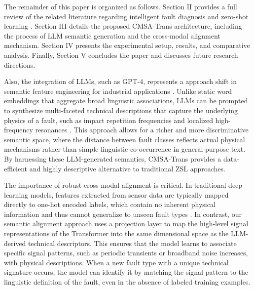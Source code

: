 \documentclass[journal]{IEEEtran}
\begin{document}
The remainder of this paper is organized as follows. Section II provides a full review of the related literature regarding intelligent fault diagnosis and zero-shot learning \cite{li2022zero}. Section III details the proposed CMSA-Trans architecture, including the process of LLM semantic generation and the cross-modal alignment mechanism. Section IV presents the experimental setup, results, and comparative analysis. Finally, Section V concludes the paper and discusses future research directions.

Also, the integration of LLMs, such as GPT-4, represents a approach shift in semantic feature engineering for industrial applications \cite{bubeck2023sparks}. Unlike static word embeddings that aggregate broad linguistic associations, LLMs can be prompted to synthesize multi-faceted technical descriptions that capture the underlying physics of a fault, such as impact repetition frequencies and localized high-frequency resonances \cite{brown2020language}. This approach allows for a richer and more discriminative semantic space, where the distance between fault classes reflects actual physical mechanisms rather than simple linguistic co-occurrence in general-purpose text. By harnessing these LLM-generated semantics, CMSA-Trans provides a data-efficient and highly descriptive alternative to traditional ZSL approaches.

The importance of robust cross-modal alignment is critical. In traditional deep learning models, features extracted from sensor data are typically mapped directly to one-hot encoded labels, which contain no inherent physical information and thus cannot generalize to unseen fault types \cite{goodfellow2016deep, lecun2015deep}. In contrast, our semantic alignment approach uses a projection layer to map the high-level signal representations of the Transformer into the same dimensional space as the LLM-derived technical descriptors. This ensures that the model learns to associate specific signal patterns, such as periodic transients or broadband noise increases, with physical descriptions. When a new fault type with a unique technical signature occurs, the model can identify it by matching the signal pattern to the linguistic definition of the fault, even in the absence of labeled training examples.
\end{document}
